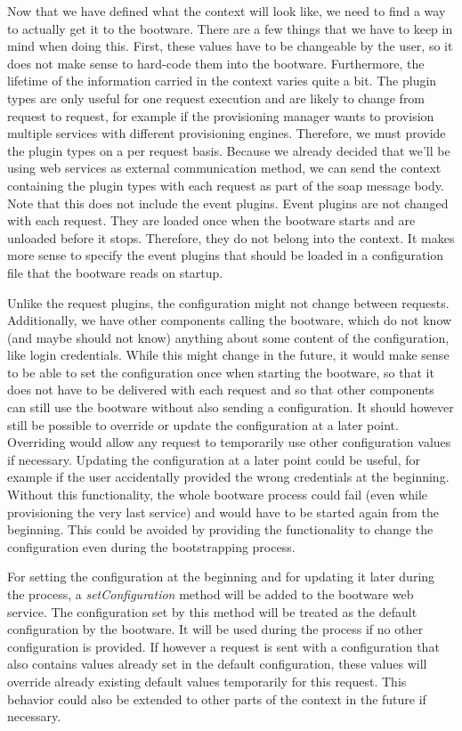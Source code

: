 Now that we have defined what the context will look like, we need to find a way to actually get it to the bootware.
There are a few things that we have to keep in mind when doing this.
First, these values have to be changeable by the user, so it does not make sense to hard-code them into the bootware.
Furthermore, the lifetime of the information carried in the context varies quite a bit.
The plugin types are only useful for one request execution and are likely to change from request to request, for example if the provisioning manager wants to provision multiple services with different provisioning engines.
Therefore, we must provide the plugin types on a per request basis.
Because we already decided that we'll be using web services as external communication method, we can send the context containing the plugin types with each request as part of the soap message body.
Note that this does not include the event plugins.
Event plugins are not changed with each request.
They are loaded once when the bootware starts and are unloaded before it stops.
Therefore, they do not belong into the context.
It makes more sense to specify the event plugins that should be loaded in a configuration file that the bootware reads on startup.

Unlike the request plugins, the configuration might not change between requests.
Additionally, we have other components calling the bootware, which do not know (and maybe should not know) anything about some content of the configuration, like login credentials.
While this might change in the future, it would make sense to be able to set the configuration once when starting the bootware, so that it does not have to be delivered with each request and so that other components can still use the bootware without also sending a configuration.
It should however still be possible to override or update the configuration at a later point.
Overriding would allow any request to temporarily use other configuration values if necessary.
Updating the configuration at a later point could be useful, for example if the user accidentally provided the wrong credentials at the beginning.
Without this functionality, the whole bootware process could fail (even while provisioning the very last service) and would have to be started again from the beginning.
This could be avoided by providing the functionality to change the configuration even during the bootstrapping process.

For setting the configuration at the beginning and for updating it later during the process, a \textit{setConfiguration} method will be added to the bootware web service.
The configuration set by this method will be treated as the default configuration by the bootware.
It will be used during the process if no other configuration is provided.
If however a request is sent with a configuration that also contains values already set in the default configuration, these values will override already existing default values temporarily for this request.
This behavior could also be extended to other parts of the context in the future if necessary.

